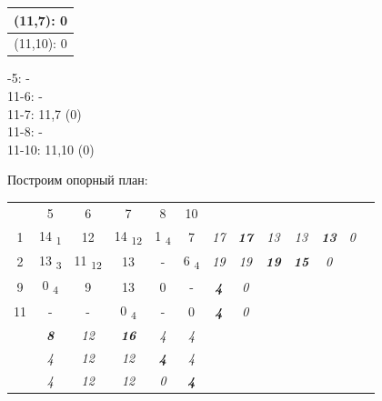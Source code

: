 \documentclass[listings]{labreport}
\begin{document}
\begin{multicols}{2}
\begin{tabular}{|c|}
\hline
(11,7): 0 \\ \hline
(11,10): 0 \\ \hline
\end{tabular}

\columnbreak
{}-5: - \\
11-6: - \\
11-7: 11,7 (0) \\
11-8: - \\
11-10: 11,10 (0) \\
\end{multicols}

Построим опорный план:

{\renewcommand{\arraystretch}{1.4}
\begin{tabular}{c|c|c|c|c|c|ccccccc}
\multicolumn{1}{c}{} &
  \multicolumn{1}{c}{5} &
  \multicolumn{1}{c}{6} &
  \multicolumn{1}{c}{7} &
  \multicolumn{1}{c}{8} &
  \multicolumn{1}{c}{10} \\ \cline{2-6}
1 & 14 \textsubscript{1} & 12 & 14 \textsubscript{12} & 1 \textsubscript{4} & 7
  & \textit{17}
  & \textbf{\textit{17}}
  & \textit{13}
  & \textit{13}
  & \textbf{\textit{13}}
  & \textit{0}
  \\ \cline{2-6}
2 & 13 \textsubscript{3} & 11 \textsubscript{12} & 13 & - & 6 \textsubscript{4}
  & \textit{19}
  & \textit{19}
  & \textbf{\textit{19}}
  & \textbf{\textit{15}}
  & \textit{0}
  \\ \cline{2-6}
9 & 0 \textsubscript{4} & 9 & 13 & 0 & -
  & \textbf{\textit{4}}
  & \textit{0}
  \\ \cline{2-6}
11 & - & - & 0 \textsubscript{4} & - & 0
  & \textbf{\textit{4}}
  & \textit{0}
  \\ \cline{2-6}
\multicolumn{1}{c}{} &
  \multicolumn{1}{c}{\textbf{\textit{8}}} &
  \multicolumn{1}{c}{\textit{12}} &
  \multicolumn{1}{c}{\textbf{\textit{16}}} &
  \multicolumn{1}{c}{\textit{4}} &
  \multicolumn{1}{c}{\textit{4}} \\
\multicolumn{1}{c}{} &
  \multicolumn{1}{c}{\textit{4}} &
  \multicolumn{1}{c}{\textit{12}} &
  \multicolumn{1}{c}{\textit{12}} &
  \multicolumn{1}{c}{\textbf{\textit{4}}} &
  \multicolumn{1}{c}{\textit{4}} \\
\multicolumn{1}{c}{} &
  \multicolumn{1}{c}{\textit{4}} &
  \multicolumn{1}{c}{\textit{12}} &
  \multicolumn{1}{c}{\textit{12}} &
  \multicolumn{1}{c}{\textit{0}} &
  \multicolumn{1}{c}{\textbf{\textit{4}}} \\

\end{tabular}}
\end{document}
